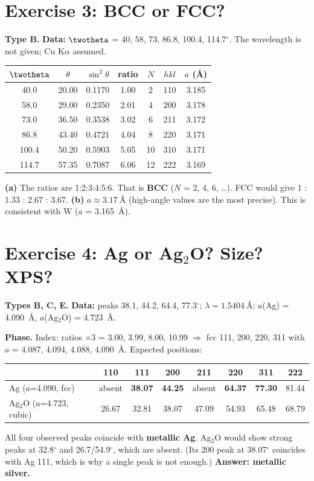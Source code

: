 \section{Exercise 3: BCC or FCC?}
\textbf{Type B.} \textbf{Data:} $\twotheta$ = 40, 58, 73, 86.8, 100.4, 114.7$^\circ$. The wavelength is not given; Cu
K$\alpha$ assumed.
\begin{center}
\small
\begin{tabular}{@{}ccccccc@{}}
\toprule
$\twotheta$ & $\theta$ & $\sin^2\theta$ & ratio & $N$ & $hkl$ & $a$ (\AA) \\ \midrule
40.0 & 20.00 & 0.1170 & 1.00 & 2 & 110 & 3.185 \\
58.0 & 29.00 & 0.2350 & 2.01 & 4 & 200 & 3.178 \\
73.0 & 36.50 & 0.3538 & 3.02 & 6 & 211 & 3.172 \\
86.8 & 43.40 & 0.4721 & 4.04 & 8 & 220 & 3.171 \\
100.4 & 50.20 & 0.5903 & 5.05 & 10 & 310 & 3.171 \\
114.7 & 57.35 & 0.7087 & 6.06 & 12 & 222 & 3.169 \\
\bottomrule
\end{tabular}
\end{center}
\textbf{(a)} The ratios are 1:2:3:4:5:6. That is \textbf{BCC} ($N$ = 2, 4, 6, \ldots). FCC would give
1 : 1.33 : 2.67 : 3.67.
\textbf{(b)} $\boxed{a \approx \SI{3.17}{\angstrom}}$ (high-angle values are the most precise). This is consistent with W
($a$ = \SI{3.165}{\angstrom})\extra.

\section{Exercise 4: Ag or Ag$_2$O? Size? XPS?}
\textbf{Types B, C, E.} \textbf{Data:} peaks 38.1, 44.2, 64.4, 77.3$^\circ$; $\lambda = \SI{1.5404}{\angstrom}$;
$a$(Ag) = \SI{4.090}{\angstrom}, $a$(Ag$_2$O) = \SI{4.723}{\angstrom}.

\textbf{Phase.} Index: ratios $\times3$ = 3.00, 3.99, 8.00, 10.99 $\Rightarrow$ fcc 111, 200, 220, 311 with
$a$ = 4.087, 4.094, 4.088, \SI{4.090}{\angstrom}.
Expected positions:
\begin{center}
\small
\begin{tabular}{@{}lccccccc@{}}
\toprule
 & 110 & 111 & 200 & 211 & 220 & 311 & 222 \\ \midrule
Ag ($a$=4.090, fcc) & absent & \textbf{38.07} & \textbf{44.25} & absent & \textbf{64.37} & \textbf{77.30} & 81.44 \\
Ag$_2$O ($a$=4.723, cubic) & 26.67 & 32.81 & 38.07 & 47.09 & 54.93 & 65.48 & 68.79 \\
\bottomrule
\end{tabular}
\end{center}
All four observed peaks coincide with \textbf{metallic Ag}. Ag$_2$O would show strong peaks at 32.8$^\circ$ and
26.7/54.9$^\circ$, which are absent. (Its 200 peak at 38.07$^\circ$ coincides with Ag 111, which is why a single peak is not
enough.) \textbf{Answer: metallic silver.}

